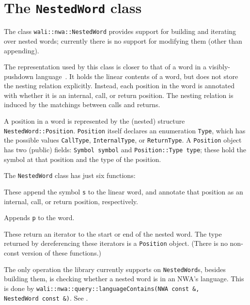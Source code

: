 \section{The \texttt{NestedWord} class}
\label{Se:class-nested-word}

The class \texttt{wali::nwa::NestedWord} provides support for
building and iterating over nested words; currently there
is no support for modifying them (other than appending).

The representation used by this class is closer to that of a word in a
visibly-pushdown language~\cite{JACM:AM2009}. It holds the linear contents of
a word, but does not store the nesting relation explicitly. Instead, each
position in the word is annotated with whether it is an internal, call, or
return position. The nesting relation is induced by the matchings between
calls and returns.

A position in a word is represented by the (nested) structure
\texttt{NestedWord::Position}. \texttt{Position} itself declares an
enumeration \texttt{Type}, which has the possible values \texttt{CallType},
\texttt{InternalType}, or \texttt{ReturnType}.
A \texttt{Position} object has two (public) fields: \texttt{Symbol symbol}
and \texttt{Position::Type type}; these hold the symbol at that position and
the type of the position.


The \texttt{NestedWord} class has just six functions:
\begin{functionlist}
    These append the symbol \texttt{s} to the linear word, and annotate that
    position as an internal, call, or return position, respectively.

    Appends \texttt{p} to the word.

    These return an iterator to the start or end
    of the nested word. The type returned by dereferencing these iterators is
    a \texttt{Position} object. (There is no non-const version of these
    functions.)
\end{functionlist}

The only operation the library currently supports on
\texttt{NestedWord}s, besides building them, is checking whether a
nested word is in an NWA's language. This is done by
\texttt{wali::nwa::query::languageContains(\mbox{NWA const \&}, \mbox{NestedWord const \&})}. See
.


